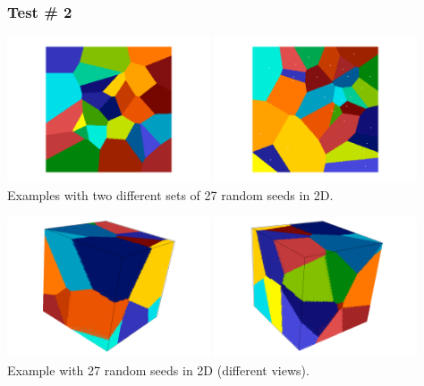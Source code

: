 \subsubsection*{Test \# 2}

\begin{center}
\includegraphics[width=6cm]{python_codes/fieldstone_125/results/test2_a}
\includegraphics[width=6cm]{python_codes/fieldstone_125/results/test2_b}\\
{\captionfont Examples with two different sets of 27 random seeds in 2D.}
\end{center}

\begin{center}
\includegraphics[width=6cm]{python_codes/fieldstone_125/results/test2_3Da}
\includegraphics[width=6cm]{python_codes/fieldstone_125/results/test2_3Db}\\
{\captionfont Example with 27 random seeds in 2D (different views).}
\end{center}

